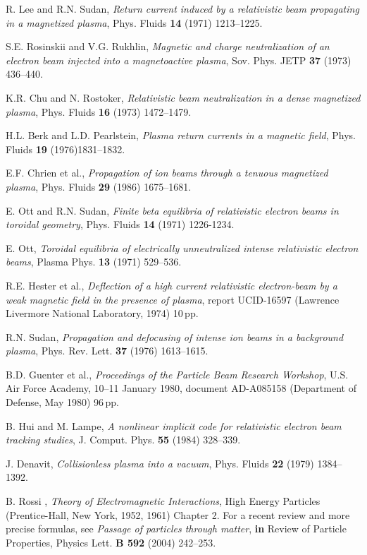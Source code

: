 \documentclass [12pt,a4paper,     ]{report} %
\begin{document}
\begin{enumerate}
 R. Lee and R.N. Sudan, \emph{Return current induced by a relativistic beam propagating in a magnetized plasma}, Phys. Fluids {\bf 14} (1971) 1213--1225.

 S.E. Rosinskii and V.G. Rukhlin, \emph{Magnetic and charge neutralization of an electron beam injected into a magnetoactive plasma}, Sov. Phys. JETP {\bf 37} (1973) 436--440.

 K.R. Chu and N. Rostoker, \emph{Relativistic beam neutralization in a dense magnetized plasma}, Phys. Fluids {\bf 16} (1973) 1472--1479.

 H.L. Berk and L.D. Pearlstein, \emph{Plasma return currents in a magnetic field}, Phys. Fluids {\bf 19} (1976)1831--1832.

 E.F. Chrien et al., \emph{Propagation of ion beams through a tenuous magnetized plasma}, Phys. Fluids {\bf 29} (1986) 1675--1681.

 E. Ott and R.N. Sudan, \emph{Finite beta equilibria of relativistic electron beams in toroidal geometry}, Phys. Fluids {\bf 14} (1971) 1226-1234.

 E. Ott, \emph{Toroidal equilibria of electrically unneutralized intense relativistic electron beams}, Plasma Phys. {\bf 13} (1971) 529--536.

 R.E. Hester et al., \emph{Deflection of a high current relativistic electron-beam by a weak magnetic field in the presence of plasma}, report UCID-16597 (Lawrence Livermore National Laboratory, 1974) 10\,pp.

 R.N. Sudan, \emph{Propagation and defocusing of intense ion beams in a background plasma}, Phys. Rev. Lett. {\bf 37} (1976) 1613--1615.

 B.D. Guenter et al., \emph{Proceedings of the Particle Beam Research Workshop}, U.S. Air Force Academy, 10--11 January 1980, document AD-A085158 (Department of Defense, May 1980) 96\,pp.

 B. Hui and M. Lampe, \emph{A nonlinear implicit code for relativistic electron beam tracking studies}, J. Comput. Phys. {\bf 55} (1984) 328--339.

 J. Denavit, \emph{Collisionless plasma into a vacuum}, Phys. Fluids {\bf 22} (1979) 1384--1392.

 B. Rossi , \emph{Theory of Electromagnetic Interactions},  High Energy Particles (Prentice-Hall, New York, 1952, 1961) Chapter 2.  For a recent review and more precise formulas, see \emph{Passage of particles through matter}, {\bf in} Review of Particle Properties, Physics Lett. {\bf B 592} (2004) 242--253.


\end{enumerate}
\end{document}
